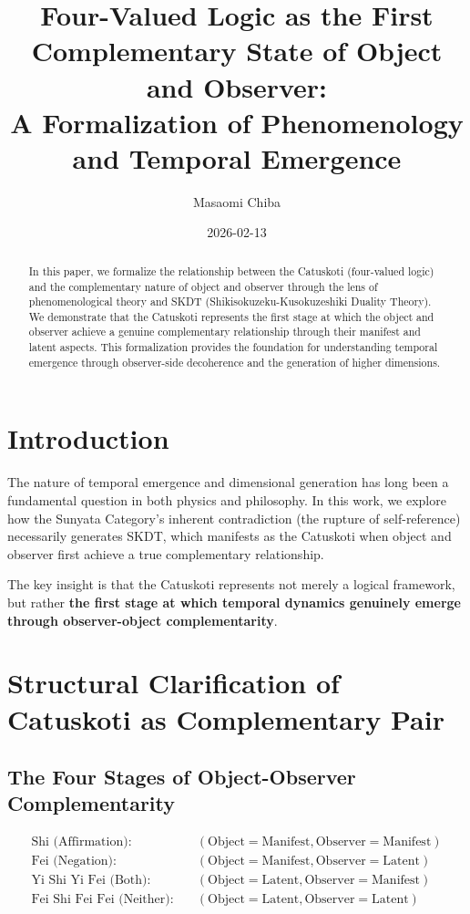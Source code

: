 \documentclass[12pt,a4paper]{article}
\title{Four-Valued Logic as the First Complementary State of Object and Observer: \\
A Formalization of Phenomenology and Temporal Emergence}
\author{Masaomi Chiba}
\date{2026-02-13}
\begin{document}
\maketitle

\begin{abstract}
In this paper, we formalize the relationship between the Catuskoti (four-valued logic) and the complementary nature of object and observer through the lens of phenomenological theory and SKDT (Shikisokuzeku-Kusokuzeshiki Duality Theory). We demonstrate that the Catuskoti represents the first stage at which the object and observer achieve a genuine complementary relationship through their manifest and latent aspects. This formalization provides the foundation for understanding temporal emergence through observer-side decoherence and the generation of higher dimensions.
\end{abstract}

\section{Introduction}

The nature of temporal emergence and dimensional generation has long been a fundamental question in both physics and philosophy. In this work, we explore how the Sunyata Category's inherent contradiction (the rupture of self-reference) necessarily generates SKDT, which manifests as the Catuskoti when object and observer first achieve a true complementary relationship.

The key insight is that the Catuskoti represents not merely a logical framework, but rather \textbf{the first stage at which temporal dynamics genuinely emerge through observer-object complementarity}.

\section{Structural Clarification of Catuskoti as Complementary Pair}

\subsection{The Four Stages of Object-Observer Complementarity}

\begin{equation}
\begin{aligned}
\text{Shi (Affirmation):} \quad &(\text{Object} = \text{Manifest}, \text{Observer} = \text{Manifest}) \\
\text{Fei (Negation):} \quad &(\text{Object} = \text{Manifest}, \text{Observer} = \text{Latent}) \\
\text{Yi Shi Yi Fei (Both):} \quad &(\text{Object} = \text{Latent}, \text{Observer} = \text{Manifest}) \\
\text{Fei Shi Fei Fei (Neither):} \quad &(\text{Object} = \text{Latent}, \text{Observer} = \text{Latent})
\end{aligned}
\end{equation}
\end{document}
